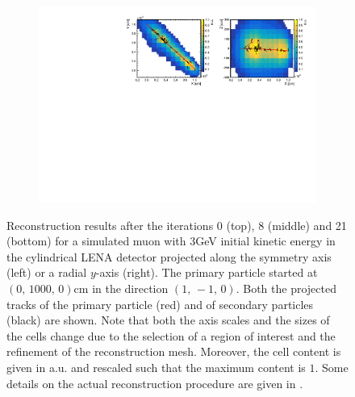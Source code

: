 \begin{figure}[b!t]
\begin{subfigure}[t]{0.99\textwidth}
    \includegraphics[trim=0.1cm 0.1cm 0.0cm 0.1cm,clip=true,width=\textwidth]
      {recon/RecoResult21.pdf}
  \end{subfigure}
  \caption{Reconstruction results after the iterations 0 (top), 8 (middle) and 21 (bottom) for a 
simulated muon with $3$\unit{GeV} initial kinetic energy in the cylindrical LENA detector projected 
along the symmetry axis (left) or a radial $y$-axis (right). The primary particle started at 
$(0,\,1000,\,0)$\unit{cm} in the direction $(1,\, -1,\, 0)$. Both the projected tracks of the 
primary particle (red) and of secondary particles (black) are shown. Note that both the axis scales 
and the sizes of the cells change due to the selection of a region of interest and the refinement 
of the reconstruction mesh. Moreover, the cell content is given in a.u. and rescaled such that the 
maximum content is $1$. Some details on the actual reconstruction procedure are given in
.
}
  \label{fig:RecoItrResults}
\end{figure}
  
  
  
  
  
  
  
  

